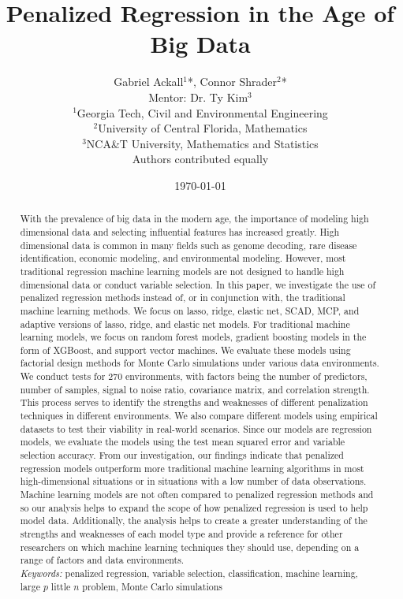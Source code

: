 \documentclass{article}
\title{Penalized Regression in the Age of Big Data} %
\author{Gabriel Ackall$^1$*, Connor Shrader$^2$* \\
		Mentor: Dr. Ty Kim$^3$ \\	
		{\footnotesize $^1$Georgia Tech, Civil and Environmental Engineering} \\
		{\footnotesize $^2$University of Central  Florida, Mathematics} \\
		{\footnotesize $^3$NCA\&T University, Mathematics and Statistics} \\
		{\footnotesize *Authors contributed equally}}
\date{\today}
\begin{document}
\maketitle

\begin{abstract}
With the prevalence of big data in the modern age, the importance of modeling high dimensional data and selecting influential features has increased greatly. High dimensional data is common in many fields such as genome decoding, rare disease identification, economic modeling, and environmental modeling. However, most traditional regression machine learning models are not designed to handle high dimensional data or conduct variable selection. In this paper, we investigate the use of penalized regression methods instead of, or in conjunction with, the traditional machine learning methods. We focus on lasso, ridge, elastic net, SCAD, MCP, and adaptive versions of lasso, ridge, and elastic net models. For traditional machine learning models, we focus on random forest models, gradient boosting models in the form of XGBoost, and support vector machines. We evaluate these models using factorial design methods for Monte Carlo simulations under various data environments. We conduct tests for 270 environments, with factors being the number of predictors, number of samples, signal to noise ratio, covariance matrix, and correlation strength. This process serves to identify the strengths and weaknesses of different penalization techniques in different environments. We also compare different models using empirical datasets to test their viability in real-world scenarios. Since our models are regression models, we evaluate the models using the test mean squared error and variable selection accuracy. From our investigation, our findings indicate that penalized regression models outperform more traditional machine learning algorithms in most high-dimensional situations or in situations with a low number of data observations. Machine learning models are not often compared to penalized regression methods and so our analysis helps to expand the scope of how penalized regression is used to help model data. Additionally, the analysis helps to create a greater understanding of the strengths and weaknesses of each model type and provide a reference for other researchers on which machine learning techniques they should use, depending on a range of factors and data environments. \\

\textit{Keywords:} penalized regression, variable selection, classification, machine learning, large $p$ little $n$ problem, Monte Carlo simulations
\end{abstract}
\end{document}
